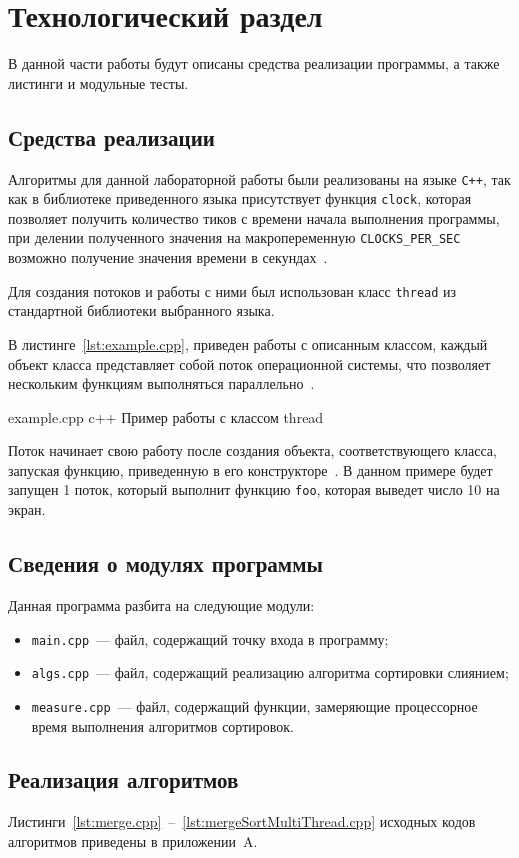 \chapter{Технологический раздел}
В данной части работы будут описаны средства реализации программы, а также листинги и  модульные  тесты.

\section{Средства реализации}
Алгоритмы для данной лабораторной работы были реализованы на языке \texttt{C++}, так как в библиотеке приведенного языка
присутствует функция \texttt{clock}, которая  позволяет получить количество тиков с времени начала выполнения программы, при делении полученного значения на макропеременную \texttt{CLOCKS\_PER\_SEC} возможно получение значения времени в секундах~\cite{cpp-time}.

Для создания потоков и работы с ними был использован класс \texttt{thread} из стандартной библиотеки выбранного языка.

В листинге~\ref{lst:example.cpp}, приведен работы с описанным классом, каждый объект класса представляет собой поток операционной системы, что позволяет нескольким функциям выполняться параллельно~\cite{std-thread}. 

{example.cpp} 
{c++} 
{Пример работы с классом thread} 

Поток начинает свою работу после создания объекта, соответствующего класса, запуская функцию, приведенную в его конструкторе~\cite{std-thread}.
В данном примере будет запущен 1 поток, который выполнит функцию \texttt{foo}, которая выведет число 10 на экран.

\section{Сведения о модулях программы}
Данная программа разбита на следующие модули:
\begin{itemize}
	\item \texttt{main.cpp}~--- файл, содержащий точку входа в программу;
	\item \texttt{algs.cpp}~--- файл, содержащий реализацию алгоритма сортировки слиянием;
	\item \texttt{measure.cpp}~--- файл, содержащий функции, замеряющие процессорное время выполнения алгоритмов сортировок.
\end{itemize}

\section{Реализация алгоритмов}
Листинги~\ref{lst:merge.cpp}~--~\ref{lst:mergeSortMultiThread.cpp} исходных кодов алгоритмов приведены в приложении~A. 

